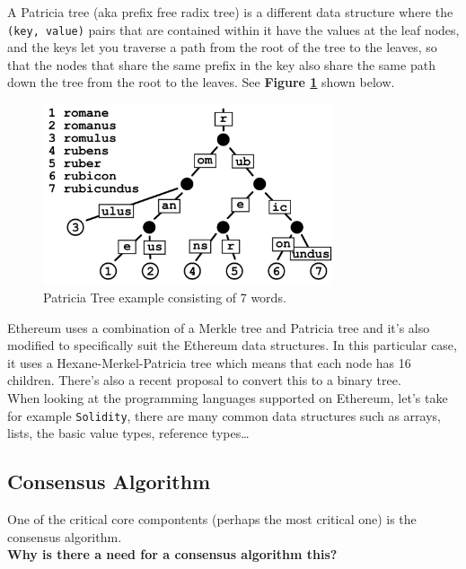 A Patricia tree (aka prefix free radix tree) is a different data structure where the \texttt{(key, value)} pairs that are contained within it have the values at the leaf nodes, and the keys let you traverse a path from the root of the tree to the leaves, so that the nodes that share the same prefix in the key also share the same path down the tree from the root to the leaves. See \textbf{Figure \ref{Patricia_tree}} shown below.

\begin{figure}[htbp!]
\centering
\includegraphics[width=0.76\textwidth]{dependencies/Img/Patricia_Tree.png}
\caption{Patricia Tree example consisting of 7 words.}
\label{Patricia_tree}
\end{figure}

Ethereum uses a combination of a Merkle tree and Patricia tree and it's also modified to specifically suit the Ethereum data structures.
In this particular case, it uses a Hexane-Merkel-Patricia tree which means that each node has 16 children.
There's also a recent proposal to convert this to a binary tree.\\

When looking at the programming languages supported on Ethereum, let's take for example \texttt{Solidity}, there are many common data structures such as arrays, lists, the basic value types, reference types\dots

\subsection*{Consensus Algorithm}

One of the critical core compontents  (perhaps the most critical one) is the consensus algorithm.\\

\textbf{Why is there a need for a consensus algorithm this?}\\

